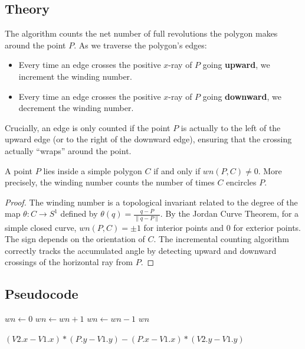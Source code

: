 \subsection{Theory}

The algorithm counts the net number of full revolutions the polygon makes around the point $P$. As we traverse the polygon's edges:
\begin{itemize}
\item Every time an edge crosses the positive $x$-ray of $P$ going \textbf{upward}, we increment the winding number.
\item Every time an edge crosses the positive $x$-ray of $P$ going \textbf{downward}, we decrement the winding number.
\end{itemize}

Crucially, an edge is only counted if the point $P$ is actually to the left of the upward edge (or to the right of the downward edge), ensuring that the crossing actually ``wraps'' around the point.

\begin{theorem}\label{thm:winding_correctness}
A point $P$ lies inside a simple polygon $C$ if and only if $wn(P, C) \ne 0$. More precisely, the winding number counts the number of times $C$ encircles $P$.
\end{theorem}
\begin{proof}
The winding number is a topological invariant related to the degree of the map $\theta: C \to S^1$ defined by $\theta(q) = \frac{q - P}{\|q - P\|}$. By the Jordan Curve Theorem, for a simple closed curve, $wn(P, C) = \pm 1$ for interior points and $0$ for exterior points. The sign depends on the orientation of $C$. The incremental counting algorithm correctly tracks the accumulated angle by detecting upward and downward crossings of the horizontal ray from $P$.
\end{proof}

\subsection{Pseudocode}

\begin{algorithm}[htbp]
\caption{Point-in-Polygon via Winding Number}
\label{alg:winding_number}
\begin{algorithmic}[1]
  \State $wn \gets 0$
          \State $wn \gets wn + 1$
        \EndIf
      \EndIf
    \Else
          \State $wn \gets wn - 1$
        \EndIf
      \EndIf
    \EndIf
  \EndFor
  \State \Return $wn$
\EndFunction

  \State \Return $(V2.x - V1.x) * (P.y - V1.y) - (P.x - V1.x) * (V2.y - V1.y)$
\EndFunction
\end{algorithmic}
\end{algorithm}

